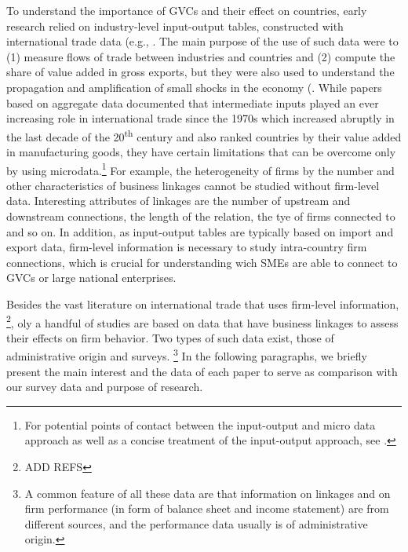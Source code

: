 \documentclass[final, dvipsnames, authoryear,12pt]{elsarticle}
\begin{document}
To understand the importance of GVCs and their effect on countries, early research relied on industry-level input-output tables, constructed with international trade data (e.g., \cite{johnson2012accounting, hummels2001nature}. The main purpose of the use of such data were to (1) measure flows of trade between industries and countries and (2) compute the share of value added in gross exports, but they were also used to understand the propagation and amplification of small shocks in the economy (\cite{acemoglu2016networks}. While papers based on aggregate data documented that intermediate inputs played an ever increasing role in international trade since the 1970s which increased abruptly in the last decade of the 20\textsuperscript{th} century and also ranked countries by their value added in manufacturing goods, they have certain limitations that can be overcome only by using microdata.\footnote{For potential points of contact between the input-output and micro data approach as well as a concise treatment of the input-output approach, see \cite{johnson2018measuring}.} For example, the heterogeneity of firms by the number and other characteristics of business linkages cannot be studied without firm-level data. Interesting attributes of linkages are the number of upstream and downstream connections, the length of the relation, the tye of firms connected to and so on. In addition, as input-output tables are typically based on import and export data, firm-level information is necessary to study intra-country firm connections, which is crucial for understanding wich SMEs are able to connect to GVCs or large national enterprises.

Besides the vast literature on international trade that uses firm-level information, \footnote{ADD REFS}, oly a handful of studies are based on data that have business linkages to assess their effects on firm behavior. Two types of such data exist, those of administrative origin and surveys. \footnote{A common feature of all these data are that information on linkages and on firm performance (in form of balance sheet and income statement) are from different sources, and the performance data usually is of administrative origin.} In the following paragraphs, we briefly present the main interest and the data of each paper to serve as comparison with our survey data and purpose of research.
\end{document}
